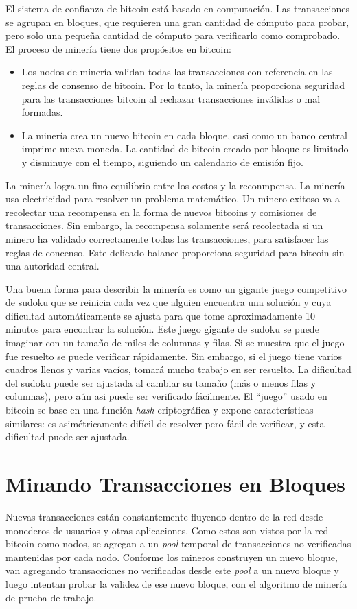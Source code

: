 \documentclass[10pt,journal,compsoc]{IEEEtran}
\begin{document}
El sistema de confianza de bitcoin está basado en computación. Las transacciones se agrupan en bloques, que requieren una gran cantidad de cómputo para probar, pero solo una pequeña cantidad de cómputo para verificarlo como comprobado. El proceso de minería tiene dos propósitos en bitcoin:
\begin{itemize}
    \item Los nodos de minería validan todas las transacciones con referencia en las reglas de consenso de bitcoin. Por lo tanto, la minería proporciona seguridad para las transacciones bitcoin al rechazar transacciones inválidas o mal formadas.
    \item La minería crea un nuevo bitcoin en cada bloque, casi como un banco central imprime nueva moneda. La cantidad de bitcoin creado por bloque es limitado y disminuye con el tiempo, siguiendo un calendario de emisión fijo.  
\end{itemize}

La minería logra un fino equilibrio entre los costos y la reconmpensa. La minería usa electricidad para resolver un problema matemático. Un minero exitoso va a recolectar una recompensa en la forma de nuevos bitcoins y comisiones de transacciones. Sin embargo, la recompensa solamente será recolectada si un minero ha validado correctamente todas las transacciones, para satisfacer las reglas de concenso. Este delicado balance proporciona seguridad para bitcoin sin una autoridad central.

Una buena forma para describir la minería es como un gigante juego competitivo de sudoku que se reinicia cada vez que alguien encuentra una solución y cuya dificultad automáticamente se ajusta para que tome aproximadamente 10 minutos para encontrar la solución. Este juego gigante de sudoku se puede imaginar con un tamaño de miles de columnas y filas. Si se muestra que el juego fue resuelto se puede verificar rápidamente. Sin embargo, si el juego tiene varios cuadros llenos y varias vacíos, tomará mucho trabajo en ser resuelto. La dificultad del sudoku puede ser ajustada al cambiar su tamaño (más o menos filas y columnas), pero aún asi puede ser verificado fácilmente. El ``juego'' usado en bitcoin se base en una función \emph{hash} criptográfica y expone características similares: es asimétricamente difícil de resolver pero fácil de verificar, y esta dificultad puede ser ajustada.

\section{Minando Transacciones en Bloques}
Nuevas transacciones están constantemente fluyendo dentro de la red desde monederos de usuarios y otras aplicaciones. Como estos son vistos por la red bitcoin como nodos, se agregan a un \emph{pool} temporal de transacciones no verificadas mantenidas por cada nodo. Conforme los mineros construyen un nuevo bloque, van agregando transacciones no verificadas desde este \emph{pool} a un nuevo bloque y luego intentan probar la validez de ese nuevo bloque, con el algoritmo de minería de prueba-de-trabajo. 
\end{document}
